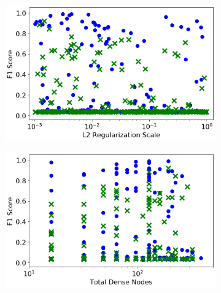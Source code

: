 \begin{figure}[H]
    \begin{subfigure}[b]{0.49\textwidth}
         \centering
         \includegraphics[width=\textwidth]{images/cnn_l2_reg.png}
         \caption{}
         \label{fig:cnn_l2_reg}
     \end{subfigure}
     \hfill
     \begin{subfigure}[b]{0.49\textwidth}
         \centering
         \includegraphics[width=\textwidth]{images/cnn_dense_nodes_total.png}
         \caption{}
         \label{fig:cnn_dense_nodes_total}
     \end{subfigure}  
     

\end{figure}
